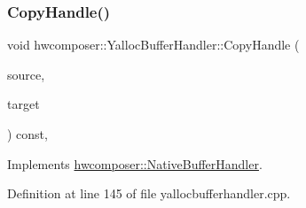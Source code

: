 \subsubsection{\texorpdfstring{Copy\+Handle()}{CopyHandle()}}
{\footnotesize\ttfamily void hwcomposer\+::\+Yalloc\+Buffer\+Handler\+::\+Copy\+Handle (\begin{DoxyParamCaption}\item[{\mbox{\hyperlink{alios_2platformdefines_8h_ac0a2eaf260f556d17fe489911f017bdf}{H\+W\+C\+Native\+Handle}}}]{source,  }\item[{\mbox{\hyperlink{alios_2platformdefines_8h_ac0a2eaf260f556d17fe489911f017bdf}{H\+W\+C\+Native\+Handle}} $\ast$}]{target }\end{DoxyParamCaption}) const\hspace{0.3cm}{\ttfamily [override]}, {\ttfamily [virtual]}}



Implements \mbox{\hyperlink{classhwcomposer_1_1NativeBufferHandler_a96581fb8bd36e959c8da6b9f634ecd32}{hwcomposer\+::\+Native\+Buffer\+Handler}}.



Definition at line 145 of file yallocbufferhandler.\+cpp.


\begin{DoxyCode}{0}
\end{DoxyCode}
\mbox{\label{classhwcomposer_1_1YallocBufferHandler_a33d2042ab272653ebac4fcab8e957c8f}} 
